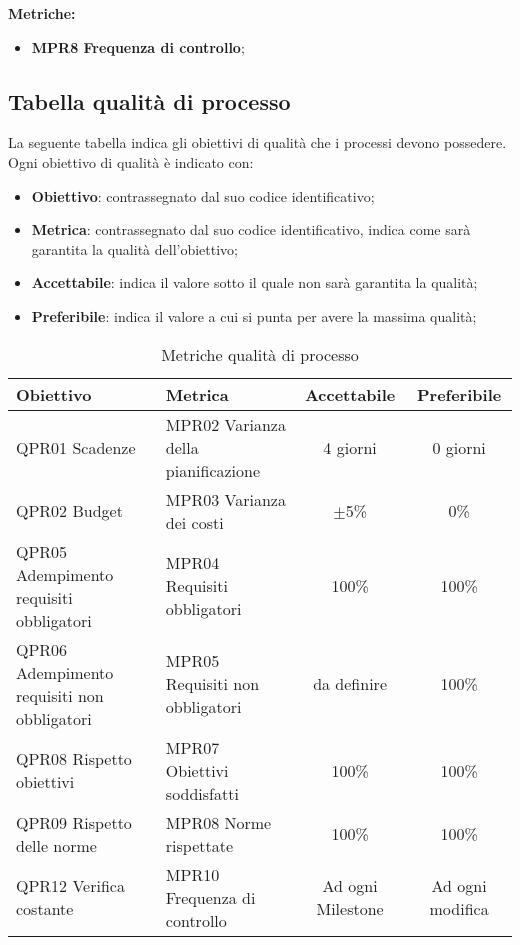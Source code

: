 \documentclass[../piano_di_qualifica.tex]{subfiles}
\begin{document}
\textbf{Metriche:}
\smallbreak
\begin{itemize}
	\item \textbf{MPR8 Frequenza di controllo};
\end{itemize}

\subsection{Tabella qualità di processo}
La seguente tabella indica gli obiettivi di qualità che i processi devono possedere.\\
Ogni obiettivo di qualità è indicato con:
\smallbreak
\begin{itemize}
	\item \textbf{Obiettivo}: contrassegnato dal suo codice identificativo;
	\item \textbf{Metrica}: contrassegnato dal suo codice identificativo, indica come sarà garantita la qualità dell'obiettivo;
	\item \textbf{Accettabile}: indica il valore sotto il quale non sarà garantita la qualità;
	\item \textbf{Preferibile}: indica il valore a cui si punta per avere la massima qualità;
\end{itemize}

\begin{table}[!ht]
	\centering
	\begin{tabular}{|p{3.5cm}|p{3.5cm}|c|c|}
		\hline
		\rowcolor{lightgray}
		\textbf{Obiettivo}                          & \textbf{Metrica}                    & \textbf{Accettabile} & \textbf{Preferibile} \\
		\hline
		QPR01 Scadenze                              & MPR02 Varianza della pianificazione & 4 giorni             & 0 giorni             \\
		\hline
		QPR02 Budget                                & MPR03 Varianza dei costi            & $\pm$5\%             & 0\%                  \\
		\hline
		QPR05 Adempimento requisiti obbligatori     & MPR04 Requisiti obbligatori         & 100\%                & 100\%                \\
		\hline
		QPR06 Adempimento requisiti non obbligatori & MPR05 Requisiti non obbligatori     &  da definire              &  100\%                  \\
		\hline
		QPR08 Rispetto obiettivi                    & MPR07 Obiettivi soddisfatti         & 100\%                & 100\%                \\
		\hline
		QPR09 Rispetto delle norme                  & MPR08 Norme rispettate              & 100\%                & 100\%                \\
		\hline
		QPR12 Verifica costante                     & MPR10 Frequenza di controllo        & Ad ogni Milestone    & Ad ogni modifica     \\
		\hline
	\end{tabular}
	\caption{Metriche qualità di processo}
\end{table}
\end{document}
